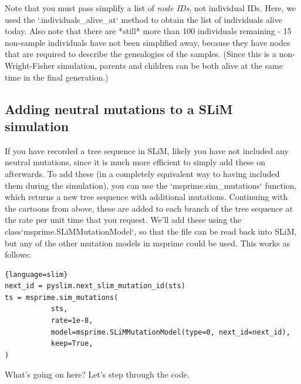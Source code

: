 \documentclass[12pt]{article}
\begin{document}
Note that you must pass simplify a list of \textit{node IDs}, not individual IDs.
Here, we used the `.individuals\_alive\_at` method to obtain the list
of individuals alive today.
Also note that there are *still* more than 100 individuals remaining - 15 non-sample individuals
have not been simplified away,
because they have nodes that are required to describe the genealogies of the samples.
(Since this is a non-Wright-Fisher simulation,
parents and children can be both alive at the same time in the final generation.)



\subsection*{Adding neutral mutations to a SLiM simulation}


If you have recorded a tree sequence in SLiM, likely you have not included any neutral mutations,
since it is much more efficient to simply add these on afterwards.
To add these (in a completely equivalent way to having included them during the simulation),
you can use the `msprime.sim\_mutations` function, which returns a new tree sequence with additional mutations.
Continuing with the cartoons from above, these are added to each branch of the tree sequence
at the rate per unit time that you request.
We'll add these using the {class}`msprime.SLiMMutationModel`, so that the file can be read back into SLiM,
but any of the other mutation models in msprime could be used.
This works as follows:
\begin{lstlisting}{language=slim}
next_id = pyslim.next_slim_mutation_id(sts)
ts = msprime.sim_mutations(
           sts,
           rate=1e-8,
           model=msprime.SLiMMutationModel(type=0, next_id=next_id),
           keep=True,
)
\end{lstlisting}


What's going on here? Let's step through the code.
\end{document}
